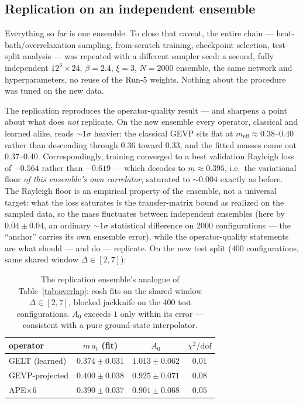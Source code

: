 \documentclass[11pt,a4paper]{article}
\newcommand{\meff}{m_{\mathrm{eff}}}
\newcommand{\at}{a_t}
\begin{document}
\subsection{Replication on an independent ensemble}
\label{sec:replication}

Everything so far is one ensemble. To close that caveat, the entire chain
--- heat-bath/overrelaxation sampling, from-scratch training, checkpoint
selection, test-split analysis --- was repeated with a different sampler
seed: a second, fully independent $12^3\times24$, $\beta=2.4$, $\xi=3$,
$N=2000$ ensemble, the same network and hyperparameters, no reuse of the
Run-5 weights. Nothing about the procedure was tuned on the new data.

The replication reproduces the operator-quality result --- and sharpens a
point about what does \emph{not} replicate. On the new ensemble every
operator, classical and learned alike, reads $\sim1\sigma$ heavier: the
classical GEVP sits flat at $\meff\approx0.38$--$0.40$ rather than
descending through $0.36$ toward $0.33$, and the fitted masses come out
$0.37$--$0.40$. Correspondingly, training converged to a best validation
Rayleigh loss of $-0.564$ rather than $-0.619$ --- which decodes to
$m\approx0.395$, i.e.\ the variational floor \emph{of this ensemble's own
correlator}, saturated to $\sim0.004$ exactly as before. The Rayleigh floor
is an empirical property of the ensemble, not a universal target: what the
loss saturates is the transfer-matrix bound as realized on the sampled
data, so the mass fluctuates between independent ensembles (here by
$0.04\pm0.04$, an ordinary $\sim1\sigma$ statistical difference on 2000
configurations --- the ``anchor'' carries its own ensemble error), while
the operator-quality statements are what should --- and do --- replicate.
On the new test split ($400$ configurations, same shared window
$\Delta\in[2,7]$):

\begin{table}[htbp]
  \centering
  \begin{tabular}{lccc}
    \toprule
    operator & $m\,\at$ (fit) & $A_0$ & $\chi^2/\mathrm{dof}$ \\
    \midrule
    GELT (learned)    & $0.374\pm0.031$ & $\mathbf{1.013\pm0.062}$ & $0.01$ \\
    GEVP-projected    & $0.400\pm0.038$ & $0.925\pm0.071$          & $0.08$ \\
    APE$\times6$      & $0.390\pm0.037$ & $0.901\pm0.068$          & $0.05$ \\
    \bottomrule
  \end{tabular}
  \caption{The replication ensemble's analogue of Table~\ref{tab:overlap}:
  cosh fits on the shared window $\Delta\in[2,7]$, blocked jackknife on the
  400 test configurations. $A_0$ exceeds $1$ only within its error ---
  consistent with a pure ground-state interpolator.}
  \label{tab:replication}
\end{table}
\end{document}
